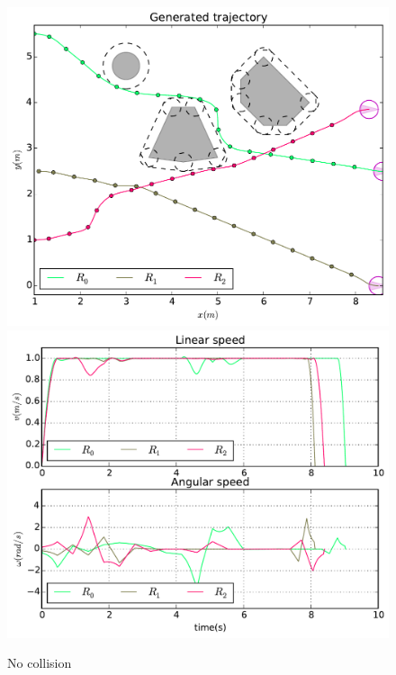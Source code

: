 \documentclass[eprint]{actapoly}
\begin{document}
\begin{figure}\centering
  \includegraphics[width=\linewidth]{./images/no_collision/multirobot-path2.pdf} 
  \\[1mm]
  \includegraphics[width=\linewidth]{./images/no_collision/multirobot-vw2.pdf} %
  \caption{No collision\label{fig:nocollision}}
\label{fig:res}
\end{figure}
\end{document}
